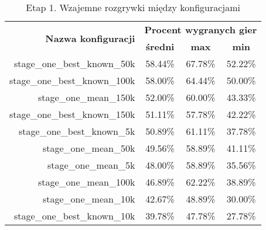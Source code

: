 \begin{longtable}[c]{|r|c|c|c|}
\caption{\label{tab:results/stage_one_all_play_all}Etap 1. Wzajemne rozgrywki między konfiguracjami} \\
\hline

\multirow{2}{*}{\textbf{Nazwa konfiguracji}} & \multicolumn{3}{|c|}{\textbf{Procent wygranych gier}} \\
\cline{2-4}
&\textbf{średni} & \textbf{max} & \textbf{min} \\
\hline
stage\_one\_best\_known\_50k & 58.44\% & 67.78\% & 52.22\% \\
\hline
stage\_one\_best\_known\_100k & 58.00\% & 64.44\% & 50.00\% \\
\hline
stage\_one\_mean\_150k & 52.00\% & 60.00\% & 43.33\% \\
\hline
stage\_one\_best\_known\_150k & 51.11\% & 57.78\% & 42.22\% \\
\hline
stage\_one\_best\_known\_5k & 50.89\% & 61.11\% & 37.78\% \\
\hline
stage\_one\_mean\_50k & 49.56\% & 58.89\% & 41.11\% \\
\hline
stage\_one\_mean\_5k & 48.00\% & 58.89\% & 35.56\% \\
\hline
stage\_one\_mean\_100k & 46.89\% & 62.22\% & 38.89\% \\
\hline
stage\_one\_mean\_10k & 42.67\% & 48.89\% & 30.00\% \\
\hline
stage\_one\_best\_known\_10k & 39.78\% & 47.78\% & 27.78\% \\
\hline
\end{longtable}
